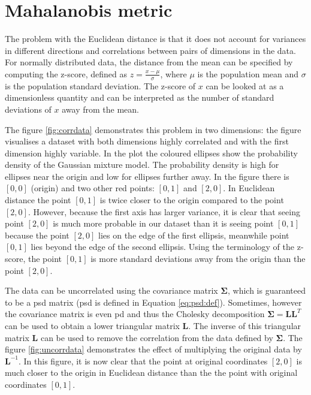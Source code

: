 \documentclass[12pt,a4paper]{report}
\begin{document}

\section{Mahalanobis metric} \label{chap:intro:mah}

The problem with the Euclidean distance is that it does not account for variances in different directions and correlations between pairs of dimensions in the data. For normally distributed data, the distance from the mean can be specified by computing the z-score, defined as $z = \frac{x-\mu}{\sigma}$, where $\mu$ is the population mean and $\sigma$ is the population standard deviation. The z-score of $x$ can be looked at as a dimensionless quantity and can be interpreted as the number of standard deviations of $x$ away from the mean.

The figure \ref{fig:corrdata} demonstrates this problem in two dimensions: the figure visualises a dataset with both dimensions highly correlated and with the first dimension highly variable. In the plot the coloured ellipses show the probability density of the Gaussian mixture model. The probability density is high for ellipses near the origin and low for ellipses further away. In the figure there is $[0,0]$ (origin) and two other red points: $[0,1]$ and $[2,0]$. In Euclidean distance the point $[0,1]$ is twice closer to the origin compared to the point $[2,0]$. However, because the first axis has larger variance, it is clear that seeing point $[2,0]$ is much more probable in our dataset than it is seeing point $[0,1]$ because the point $[2,0]$ lies on the edge of the first ellipsis, meanwhile point $[0,1]$ lies beyond the edge of the second ellipsis. Using the terminology of the z-score, the point $[0,1]$ is more standard deviations away from the origin than the point $[2,0]$.


The data can be uncorrelated using the covariance matrix $\bm{\Sigma}$, which is guaranteed to be a \ac{psd} matrix (\ac{psd} is defined in Equation \ref{eq:psd:def}). Sometimes, however the covariance matrix is even \ac{pd} and thus the Cholesky decomposition $\bm{\Sigma}=\bm{L}\bm{L}^T$ can be used to obtain a lower triangular matrix $\bm{L}$. The inverse of this triangular matrix $\bm{L}$ can be used to remove the correlation from the data defined by $\bm{\Sigma}$. The figure \ref{fig:uncorrdata} demonstrates the effect of multiplying the original data by $\bm{L}^{-1}$. In this figure, it is now clear that the point at original coordinates $[2,0]$ is much closer to the origin in Euclidean distance than the the point with original coordinates $[0,1]$.
\end{document}
